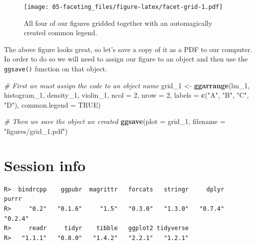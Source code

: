 \documentclass[]{book}
\newenvironment{Shaded}{\begin{snugshade}}{\end{snugshade}}
\newcommand{\KeywordTok}[1]{\textcolor[rgb]{0.13,0.29,0.53}{\textbf{#1}}}
\newcommand{\DataTypeTok}[1]{\textcolor[rgb]{0.13,0.29,0.53}{#1}}
\newcommand{\DecValTok}[1]{\textcolor[rgb]{0.00,0.00,0.81}{#1}}
\newcommand{\StringTok}[1]{\textcolor[rgb]{0.31,0.60,0.02}{#1}}
\newcommand{\CommentTok}[1]{\textcolor[rgb]{0.56,0.35,0.01}{\textit{#1}}}
\newcommand{\OtherTok}[1]{\textcolor[rgb]{0.56,0.35,0.01}{#1}}
\newcommand{\OperatorTok}[1]{\textcolor[rgb]{0.81,0.36,0.00}{\textbf{#1}}}
\newcommand{\NormalTok}[1]{#1}
\theoremstyle{definition}
\theoremstyle{definition}
\theoremstyle{definition}
\theoremstyle{remark}
\begin{document}
\begin{figure}
\centering
\texttt{[image: 05-faceting\_files/figure-latex/facet-grid-1.pdf]}
\caption{\label{fig:facet-grid}All four of our figures gridded together with
an automagically created common legend.}
\end{figure}

The above figure looks great, so let's save a copy of it as a PDF to our
computer. In order to do so we will need to assign our figure to an
object and then use the \texttt{ggsave()} function on that object.

\begin{Shaded}
\begin{Highlighting}[]
\CommentTok{# First we must assign the code to an object name}
\NormalTok{grid_}\DecValTok{1}\NormalTok{ <-}\StringTok{ }\KeywordTok{ggarrange}\NormalTok{(lm_}\DecValTok{1}\NormalTok{, histogram_}\DecValTok{1}\NormalTok{, density_}\DecValTok{1}\NormalTok{, violin_}\DecValTok{1}\NormalTok{, }
                    \DataTypeTok{ncol =} \DecValTok{2}\NormalTok{, }\DataTypeTok{nrow =} \DecValTok{2}\NormalTok{, }
                    \DataTypeTok{labels =} \KeywordTok{c}\NormalTok{(}\StringTok{"A"}\NormalTok{, }\StringTok{"B"}\NormalTok{, }\StringTok{"C"}\NormalTok{, }\StringTok{"D"}\NormalTok{),}
                    \DataTypeTok{common.legend =} \OtherTok{TRUE}\NormalTok{)}

\CommentTok{# Then we save the object we created}
\KeywordTok{ggsave}\NormalTok{(}\DataTypeTok{plot =}\NormalTok{ grid_}\DecValTok{1}\NormalTok{, }\DataTypeTok{filename =} \StringTok{"figures/grid_1.pdf"}\NormalTok{)}
\end{Highlighting}
\end{Shaded}

\section{Session info}\label{session-info-4}

\begin{Shaded}
\end{Shaded}

\begin{verbatim}
R>  bindrcpp    ggpubr  magrittr   forcats   stringr     dplyr     purrr 
R>     "0.2"   "0.1.6"     "1.5"   "0.3.0"   "1.3.0"   "0.7.4"   "0.2.4" 
R>     readr     tidyr    tibble   ggplot2 tidyverse 
R>   "1.1.1"   "0.8.0"   "1.4.2"   "2.2.1"   "1.2.1"
\end{verbatim}
\end{document}
